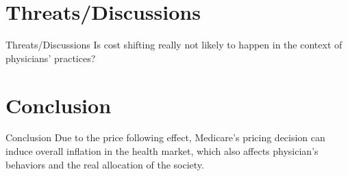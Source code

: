 \documentclass{beamer}
\begin{document}
\section{Threats/Discussions}
\begin{frame}{Threats/Discussions}
Is cost shifting really not likely to happen in the context of physicians' practices?
\end{frame}

\section{Conclusion}
\begin{frame}{Conclusion}
Due to the price following effect, Medicare's pricing decision can induce overall inflation in the health market, which also affects physician's behaviors and the real allocation of the society.

\end{frame}
\end{document}
